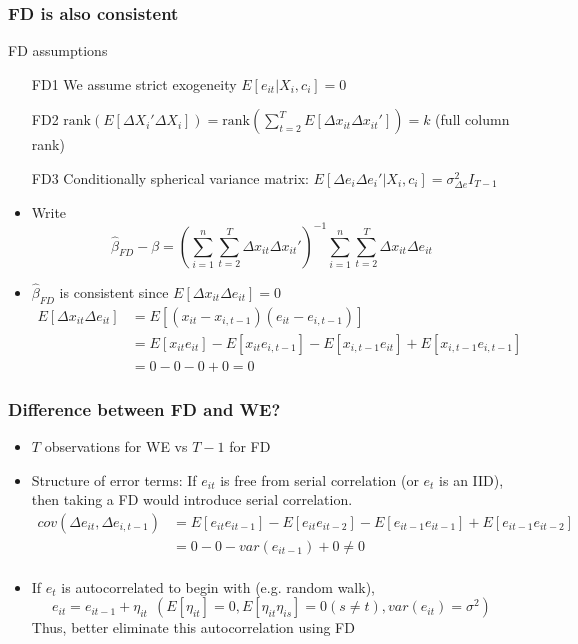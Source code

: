 \documentclass[aspectratio=169]{beamer}
\begin{document}
\begin{frame}
\frametitle{FD is also consistent}
\begin{block}{FD assumptions}
\begin{itemize}
\item[FD1] We assume strict exogeneity $E[e_{it}|X_i,c_i]=0$
\item[FD2] $\text{rank}\left(E [\Delta X_i' \Delta X_i]\right)=\text{rank}\left(\sum_{t=2}^T E [\Delta {x}_{it} \Delta {x}_{it}']\right)=k$ (full column rank)
\item[FD3] Conditionally spherical variance matrix: $E[\Delta e_i\Delta e_i'|X_i,c_i]=\sigma_{\Delta e}^2 I_{T-1}$
\end{itemize}
\end{block}
\begin{itemize}
\item  Write
\[
\hat{\beta}_{FD}-\beta =\left(\sum_{i=1}^n\sum_{t=2}^T \Delta x_{it}\Delta x_{it}'\right)^{-1}\sum_{i=1}^n\sum_{t=2}^T \Delta x_{it}\Delta e_{it}
\]
\item $\hat{\beta}_{FD}$ is consistent since $E[\Delta x_{it} \Delta e_{it}]=0$
\[
\begin{aligned}
E[\Delta x_{it} \Delta e_{it}]&=E[ (x_{it}-x_{i,t-1})( e_{it}-e_{i,t-1})]\\
&=E[ x_{it}e_{it}]-E[x_{it}e_{i,t-1}]-E[x_{i,t-1}e_{it}]+E[x_{i,t-1}e_{i,t-1}]\\
&= 0-0-0+0=0
\end{aligned}
\] 
 \end{itemize}
\end{frame}



\begin{frame}
\frametitle{Difference between FD and WE?}
\begin{itemize}
\item $T$ observations for WE vs $T-1$ for FD
\item Structure of error terms: If $e_{it}$ is free from serial correlation (or $e_t$ is an IID), then taking a FD would introduce serial correlation.
\[
\begin{aligned}
cov(\Delta e_{it},\Delta e_{i,t-1})&=E[e_{it}e_{it-1}]-E[e_{it}e_{it-2}]-E[e_{it-1}e_{it-1}]+E[e_{it-1}e_{it-2}]\\
&=0-0-var(e_{it-1})+0\neq 0 \\
\end{aligned}
\]
\item If $e_t$ is autocorrelated to begin with (e.g. random walk),  
\[
e_{it}=e_{it-1}+\eta_{it} \ \ (E[\eta_{it}]=0, E[\eta_{it}\eta_{is}]=0 (s\neq t), var(e_{it})=\sigma^2)
\]
Thus, better eliminate this autocorrelation using FD
 \end{itemize}
\end{frame}
\end{document}
